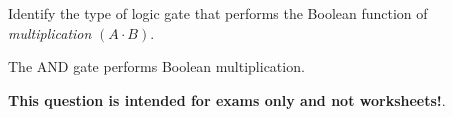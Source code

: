 

Identify the type of logic gate that performs the Boolean function of {\it multiplication} $(A \cdot B)$.







The AND gate performs Boolean multiplication.







{\bf This question is intended for exams only and not worksheets!}.




